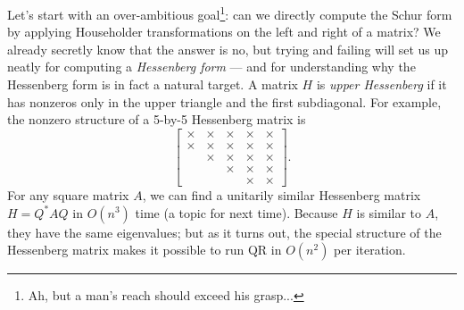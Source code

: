 \documentclass[12pt, leqno]{article}
\begin{document}
Let's start with an over-ambitious goal\footnote{Ah, but a man's reach
  should exceed his grasp...}: can we directly compute the Schur form
by applying Householder transformations on the left and right of a
matrix?  We already secretly know that the answer is no, but trying
and failing will set us up neatly for computing a {\em Hessenberg form} ---
and for understanding why the Hessenberg form is in fact a natural
target.
A matrix $H$ is {\em upper Hessenberg} if it has nonzeros only in the
upper triangle and the first subdiagonal.  For example, the nonzero
structure of a 5-by-5 Hessenberg matrix is
\[
  \begin{bmatrix}
    \times & \times & \times & \times & \times \\
    \times & \times & \times & \times & \times \\
           & \times & \times & \times & \times \\
           &        & \times & \times & \times \\
           &        &        & \times & \times
  \end{bmatrix}.
\]
For any square matrix $A$, we can find a unitarily similar Hessenberg
matrix $H = Q^* A Q$ in $O(n^3)$ time (a topic for next time).
Because $H$ is similar to $A$, they have the same eigenvalues; but
as it turns out, the special structure of the Hessenberg matrix
makes it possible to run QR in $O(n^2)$ per iteration.
\end{document}
